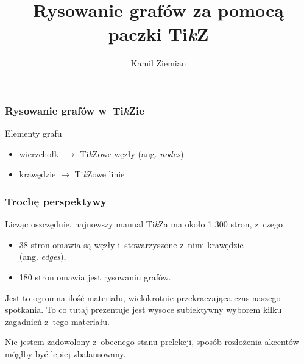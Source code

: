 \documentclass[10pt,t]{beamer}  %
\title{Rysowanie grafów za pomocą paczki Ti\emph{k}Z}
\author{Kamil Ziemian}
\date{}
\begin{document}



\maketitle



















\begin{frame}
  \frametitle{Rysowanie grafów w~Ti\emph{k}Zie}


  Elementy grafu
  \begin{itemize}
  \item wierzchołki $\to$ Ti\emph{k}Zowe węzły (ang. \emph{nodes})

  \item krawędzie $\to$ Ti\emph{k}Zowe linie

  \end{itemize}

\end{frame}




\begin{frame}
  \frametitle{Trochę perspektywy}


  Licząc oszczędnie, najnowszy manual Ti\emph{k}Za ma około 1 300
  stron, z~czego
  \begin{itemize}
  \item 38 stron omawia są węzły i~stowarzyszone z~nimi krawędzie \\
    (ang. \emph{edges}),

  \item 180 stron omawia jest rysowaniu grafów.

  \end{itemize}

  Jest to ogromna ilość materiału, wielokrotnie przekraczająca czas
  naszego spotkania. To co tutaj prezentuje jest wysoce subiektywny
  wyborem kilku zagadnień z~tego materiału.

  Nie jestem zadowolony z~obecnego stanu prelekcji, sposób rozłożenia
  akcentów mógłby być lepiej zbalansowany.

\end{frame}
\end{document}
